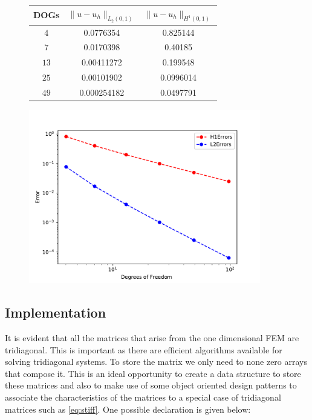 \documentclass{uonmathreport}
\theoremstyle{definition}
\theoremstyle{problem}
\theoremstyle{theorem}
\begin{document}
\begin{figure}[h!]
\begin{minipage}{0.48\hsize}
\begin{tabular}{ccc}
    \hline
     DOGs & $\|u-u_h\|_{L_2(0,1)}$  & $\|u-u_h\|_{H^1(0,1)}$   \\ \hline
     $4$ & 0.0776354  & 0.825144   \\
     $7$ & 0.0170398  & 0.40185   \\
     $13$ & 0.00411272  & 0.199548   \\
	 $25$ & 0.00101902  & 0.0996014 \\
    $49$ & 0.000254182  & 0.0497791   \\
    \hline
  \end{tabular}
  \end{minipage}
  \hfill
    \begin{minipage}{0.48\hsize}
  \includegraphics[width=0.9\textwidth]{EllipticPDE1Convergences.pdf}
  \label{fig:c}
\end{minipage}
    \end{figure}


\subsection{Implementation} \label{subsec:Implementation1}

It is evident that all the matrices that arise from the one dimensional FEM are tridiagonal. This is important as there are efficient algorithms available for solving tridiagonal systems. To store the matrix we only need to  none zero arrays that compose it. This is an ideal opportunity to create a data structure to store these matrices and also to make use of some object oriented design patterns to associate the characteristics of the matrices to a special case of tridiagonal matrices such as \ref{eq:stiff}. One possible declaration is given below:
\end{document}
